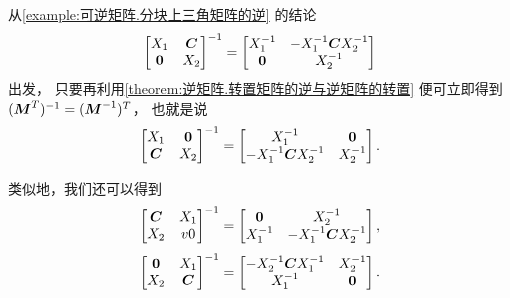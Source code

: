 \begin{remark}
从\cref{example:可逆矩阵.分块上三角矩阵的逆} 的结论\[
	\begin{bmatrix}
		X_1 & \boldsymbol{C} \\
		\boldsymbol{0} & X_2
	\end{bmatrix}^{-1}
	= \begin{bmatrix}
		X_1^{-1} & -X_1^{-1} \boldsymbol{C} X_2^{-1} \\
		\boldsymbol{0} & X_2^{-1}
	\end{bmatrix}
\]出发，
只要再利用\cref{theorem:逆矩阵.转置矩阵的逆与逆矩阵的转置}
便可立即得到\((\boldsymbol{M}^T)^{-1} = (\boldsymbol{M}^{-1})^T\)，
也就是说\[
	\begin{bmatrix}
		X_1 & \boldsymbol0 \\
		\boldsymbol{C} & X_2
	\end{bmatrix}^{-1}
	= \begin{bmatrix}
		X_1^{-1} & \boldsymbol0 \\
		-X_1^{-1} \boldsymbol{C} X_2^{-1} & X_2^{-1}
	\end{bmatrix}.
\]

类似地，我们还可以得到\[
	\begin{bmatrix}
		\boldsymbol{C} & X_1 \\
		X_2 & v0
	\end{bmatrix}^{-1}
	= \begin{bmatrix}
		\boldsymbol0 & X_2^{-1} \\
		X_1^{-1} & -X_1^{-1}\boldsymbol{C}X_2^{-1}
	\end{bmatrix},
\]\[
	\begin{bmatrix}
		\boldsymbol0 & X_1 \\
		X_2 & \boldsymbol{C}
	\end{bmatrix}^{-1}
	= \begin{bmatrix}
		-X_2^{-1}\boldsymbol{C}X_1^{-1} & X_2^{-1} \\
		X_1^{-1} & \boldsymbol0
	\end{bmatrix}.
\]
\end{remark}
